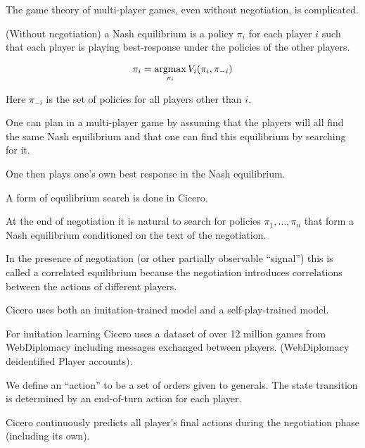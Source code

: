 {

The game theory of multi-player games, even without negotiation, is complicated.

\vfill
(Without negotiation) a Nash equilibrium is a policy $\pi_i$ for each player $i$ such that each player is playing best-response under
the policies of the other players.

$$\pi_i = \operatorname*{argmax}_{\pi_i} V_i(\pi_i,\pi_{-i})$$

\vfill
Here $\pi_{-i}$ is the set of policies for all players other than $i$.


One can plan in a multi-player game by assuming that the players will all find the same Nash equilibrium and that one can find
this equilibrium by searching for it.

\vfill
One then plays one's own best response in the Nash equilibrium.

\vfill
A form of equilibrium search is done in Cicero.


At the end of negotiation it is natural to search for policies $\pi_1,\ldots,\pi_n$ that form a Nash equilibrium
conditioned on the text of the negotiation.

\vfill
In the presence of negotiation (or other partially observable ``signal'') this is called a correlated equilibrium
because the negotiation introduces correlations between the actions of different players.



Cicero uses both an imitation-trained model and a self-play-trained model.

\vfill
For imitation learning Cicero uses 
a dataset of over 12 million games from WebDiplomacy including messages exchanged between players. (WebDiplomacy deidentified Player accounts).


\newcommand{\act}{\mathrm{act}}
\newcommand{\mess}{\mathrm{mess}}
\newcommand{\im}{\mathrm{im}}
\newcommand{\RL}{\mathrm{RL}}


We define an ``action'' to be a set of orders given to generals.  The state transition is determined by an end-of-turn action for each player.

\vfill
Cicero continuously predicts all player's final actions during the negotiation phase (including its own).

}

